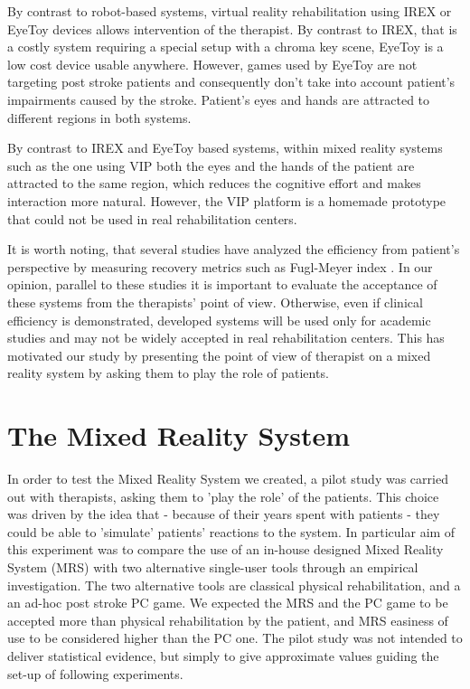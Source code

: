\documentclass[preprint,authoryear,12pt]{elsarticle}
\begin{document}
By contrast to robot-based systems, virtual reality rehabilitation using IREX or EyeToy devices allows intervention of the therapist. By contrast to IREX, that is a costly system requiring a special setup with a chroma key scene, EyeToy is a low cost device usable anywhere. However, games used by EyeToy are not targeting post stroke patients and consequently don't take into account patient's impairments caused by the stroke. Patient's eyes and hands are attracted to different regions in both systems.

By contrast to IREX and EyeToy based systems, within mixed reality systems such as the one using VIP both the eyes and the hands of the patient are attracted to the same region, which reduces the cognitive effort and makes interaction more natural. However, the VIP platform is a homemade prototype that could not be used in real rehabilitation centers.

It is worth noting, that several studies have analyzed the efficiency from patient's perspective by measuring recovery metrics such as Fugl-Meyer index \citep{P.W.DuncanM.Propst1983}.  In our opinion, parallel to these studies it is important to evaluate the acceptance of these systems from the therapists' point of view. Otherwise, even if clinical efficiency is demonstrated, developed systems will be used only for academic studies and may not be widely accepted in real rehabilitation centers. This has motivated our study by presenting the point of view of therapist on a mixed reality system by asking them to play the role of patients.



\section{The Mixed Reality System}
\label{methods}
In order to  test the Mixed Reality System we created, a pilot study was carried out with therapists, asking them to 'play the role' of the patients. This choice was driven by the idea that - because of their years spent with patients - they could be able to 'simulate' patients' reactions to the system. 
In particular aim of this experiment was to compare the use of an in-house designed Mixed Reality System (MRS) with two alternative single-user
tools through an empirical investigation. The two alternative tools are classical physical rehabilitation, and a
an ad-hoc post stroke PC game. We expected the  MRS and the PC game to be accepted more than physical rehabilitation by the patient, and MRS easiness of use to be considered higher than the PC one.  The pilot study was not intended to deliver statistical evidence, but simply to give approximate values guiding the set-up of following experiments. 
\end{document}
